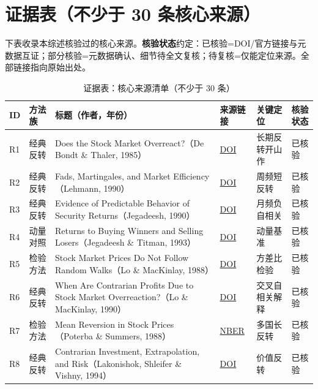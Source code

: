 \section{证据表（不少于 30 条核心来源）}\label{sec:evidence}

下表收录本综述核验过的核心来源。\textbf{核验状态}约定：\textsc{已核验}=DOI/官方链接与元数据互证；\textsc{部分核验}=元数据确认、细节待全文复核；\textsc{待复核}=仅能定位来源。全部链接指向原始出处。

\begin{longtable}{@{}>{\raggedright\arraybackslash}p{0.7cm}>{\raggedright\arraybackslash}p{2.1cm}>{\raggedright\arraybackslash}p{5.5cm}>{\raggedright\arraybackslash}p{2.2cm}>{\raggedright\arraybackslash}p{2.1cm}>{\raggedright\arraybackslash}p{1.4cm}@{}}
\caption{证据表：核心来源清单（不少于 30 条）}\label{tab:evidence}\\
\toprule
ID & 方法族 & 标题（作者，年份） & 来源链接 & 关键定位 & 核验状态 \\
\midrule
\endhead
R1 & 经典反转 & Does the Stock Market Overreact?（De Bondt \& Thaler, 1985） & \href{https://doi.org/10.1111/j.1540-6261.1985.tb05004.x}{DOI} & 长期反转开山作 & 已核验 \\
R2 & 经典反转 & Fads, Martingales, and Market Efficiency（Lehmann, 1990） & \href{https://doi.org/10.2307/2937816}{DOI} & 周频短反转 & 已核验 \\
R3 & 经典反转 & Evidence of Predictable Behavior of Security Returns（Jegadeesh, 1990） & \href{https://doi.org/10.1111/j.1540-6261.1990.tb05110.x}{DOI} & 月频负自相关 & 已核验 \\
R4 & 动量对照 & Returns to Buying Winners and Selling Losers（Jegadeesh \& Titman, 1993） & \href{https://doi.org/10.1111/j.1540-6261.1993.tb04702.x}{DOI} & 动量基准 & 已核验 \\
R5 & 检验方法 & Stock Market Prices Do Not Follow Random Walks（Lo \& MacKinlay, 1988） & \href{https://doi.org/10.1093/rfs/1.1.41}{DOI} & 方差比检验 & 已核验 \\
R6 & 经典反转 & When Are Contrarian Profits Due to Stock Market Overreaction?（Lo \& MacKinlay, 1990） & \href{https://doi.org/10.1093/rfs/3.2.175}{DOI} & 交叉自相关解释 & 已核验 \\
R7 & 检验方法 & Mean Reversion in Stock Prices（Poterba \& Summers, 1988） & \href{https://doi.org/10.3386/w2343}{NBER} & 多国长反转 & 已核验 \\
R8 & 经典反转 & Contrarian Investment, Extrapolation, and Risk（Lakonishok, Shleifer \& Vishny, 1994） & \href{https://doi.org/10.1111/j.1540-6261.1994.tb04772.x}{DOI} & 价值反转 & 已核验 \\

\end{longtable}
